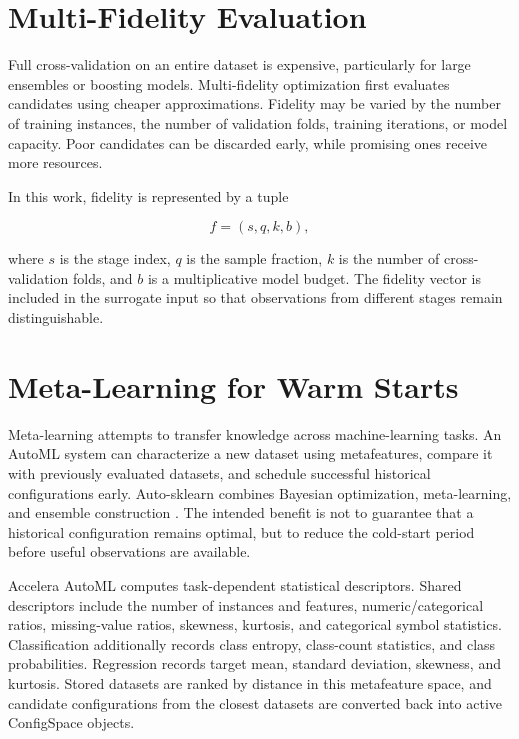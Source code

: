 \documentclass[12pt,a4paper,oneside]{report}
\newcommand{\systemname}{Accelera AutoML}
\begin{document}
\section{Multi-Fidelity Evaluation}

Full cross-validation on an entire dataset is expensive, particularly for
large ensembles or boosting models. Multi-fidelity optimization first evaluates
candidates using cheaper approximations. Fidelity may be varied by the number
of training instances, the number of validation folds, training iterations, or
model capacity. Poor candidates can be discarded early, while promising ones
receive more resources.

\noindent In this work, fidelity is represented by a tuple

\begin{equation}
  f = (s, q, k, b),
\end{equation}

\noindent where $s$ is the stage index, $q$ is the sample fraction, $k$ is the number of
cross-validation folds, and $b$ is a multiplicative model budget. The fidelity
vector is included in the surrogate input so that observations from different
stages remain distinguishable.

\section{Meta-Learning for Warm Starts}

Meta-learning attempts to transfer knowledge across machine-learning tasks.
An AutoML system can characterize a new dataset using metafeatures, compare it
with previously evaluated datasets, and schedule successful historical
configurations early. Auto-sklearn combines Bayesian optimization,
meta-learning, and ensemble construction \cite{autosklearn}. The intended
benefit is not to guarantee that a historical configuration remains optimal,
but to reduce the cold-start period before useful observations are available.

\medskip

\noindent \systemname{} computes task-dependent statistical descriptors. Shared
descriptors include the number of instances and features, numeric/categorical
ratios, missing-value ratios, skewness, kurtosis, and categorical symbol
statistics. Classification additionally records class entropy, class-count
statistics, and class probabilities. Regression records target mean, standard
deviation, skewness, and kurtosis. Stored datasets are ranked by distance in
this metafeature space, and candidate configurations from the closest datasets
are converted back into active ConfigSpace objects.
\end{document}
